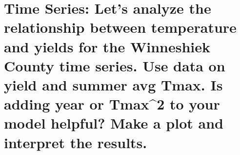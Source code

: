 \documentclass[
]{book}
\newenvironment{Shaded}{\begin{snugshade}}{\end{snugshade}}
\newcommand{\AttributeTok}[1]{\textcolor[rgb]{0.77,0.63,0.00}{#1}}
\newcommand{\CommentTok}[1]{\textcolor[rgb]{0.56,0.35,0.01}{\textit{#1}}}
\newcommand{\DecValTok}[1]{\textcolor[rgb]{0.00,0.00,0.81}{#1}}
\newcommand{\FunctionTok}[1]{\textcolor[rgb]{0.00,0.00,0.00}{#1}}
\newcommand{\NormalTok}[1]{#1}
\newcommand{\OtherTok}[1]{\textcolor[rgb]{0.56,0.35,0.01}{#1}}
\newcommand{\SpecialCharTok}[1]{\textcolor[rgb]{0.00,0.00,0.00}{#1}}
\begin{document}
\hypertarget{time-series-lets-analyze-the-relationship-between-temperature-and-yields-for-the-winneshiek-county-time-series.-use-data-on-yield-and-summer-avg-tmax.-is-adding-year-or-tmax2-to-your-model-helpful-make-a-plot-and-interpret-the-results.}{%
\section{Time Series: Let's analyze the relationship between temperature and yields for the Winneshiek County time series. Use data on yield and summer avg Tmax. Is adding year or Tmax\^{}2 to your model helpful? Make a plot and interpret the results.}\label{time-series-lets-analyze-the-relationship-between-temperature-and-yields-for-the-winneshiek-county-time-series.-use-data-on-yield-and-summer-avg-tmax.-is-adding-year-or-tmax2-to-your-model-helpful-make-a-plot-and-interpret-the-results.}}

\begin{Shaded}
\end{Shaded}
\end{document}
